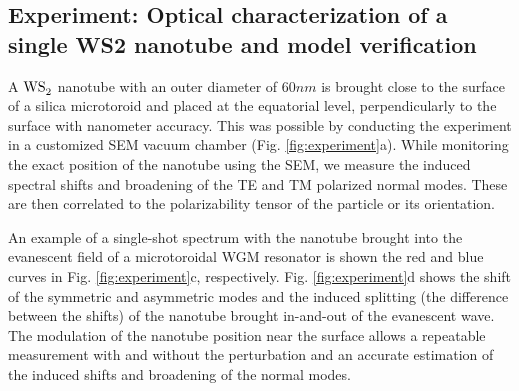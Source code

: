 \documentclass[journal=jacsat,manuscript=article]{achemso}
\begin{document}
\subsection{Experiment: Optical characterization of a single WS2 nanotube and model verification}

A $\ce{WS_2}$ nanotube with an outer diameter of $60nm$ is brought close to the surface of a silica microtoroid and placed at the equatorial level, perpendicularly to the surface with nanometer accuracy. This was possible by conducting the experiment in a customized SEM vacuum chamber (Fig. \ref{fig:experiment}a).
While monitoring the exact position of the nanotube using the SEM, we measure the induced spectral shifts and broadening of the TE and TM polarized normal modes. These are then correlated to the polarizability tensor of the particle or its orientation.

An example of a single-shot spectrum with the nanotube brought into the evanescent field of a microtoroidal WGM resonator is shown the red and blue curves in Fig. \ref{fig:experiment}c, respectively. Fig. \ref{fig:experiment}d shows the shift of the symmetric and asymmetric modes and the induced splitting (the difference between the shifts) of the nanotube brought in-and-out of the evanescent wave. The modulation of the nanotube position near the surface allows a repeatable measurement with and without the perturbation and an accurate estimation of the induced shifts and broadening of the normal modes.
\end{document}
